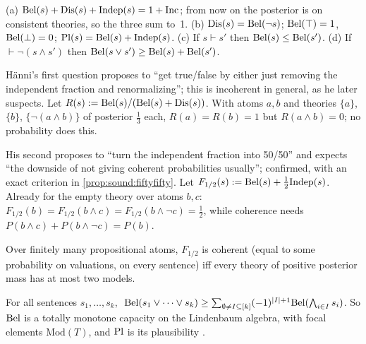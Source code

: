 \begin{proposition}\label{prop:sound:laws}
(a) $\mathrm{Bel}(s)+\mathrm{Dis}(s)+\mathrm{Indep}(s)=1+\mathrm{Inc}$; from now on the posterior is on consistent theories, so the three sum to~1. (b) $\mathrm{Dis}(s)=\mathrm{Bel}(\neg s)$; $\mathrm{Bel}(\top)=1$, $\mathrm{Bel}(\bot)=0$; $\mathrm{Pl}(s)=\mathrm{Bel}(s)+\mathrm{Indep}(s)$. (c) If $s\vdash s'$ then $\mathrm{Bel}(s)\le\mathrm{Bel}(s')$. (d) If $\vdash\neg(s\wedge s')$ then $\mathrm{Bel}(s\vee s')\ge\mathrm{Bel}(s)+\mathrm{Bel}(s')$.
\end{proposition}

\begin{example}\label{ex:sound:renorm}
H\"anni's first question proposes to ``get true/false by either just removing the independent fraction and renormalizing''; this is incoherent in general, as he later suspects. Let $R(s):=\mathrm{Bel}(s)/(\mathrm{Bel}(s)+\mathrm{Dis}(s))$. With atoms $a,b$ and theories $\{a\}$, $\{b\}$, $\{\neg(a\wedge b)\}$ of posterior $\tfrac13$ each, $R(a)=R(b)=1$ but $R(a\wedge b)=0$; no probability does this.
\end{example}

\begin{example}\label{ex:sound:fifty}
His second proposes to ``turn the independent fraction into 50/50'' and expects ``the downside of not giving coherent probabilities usually''; confirmed, with an exact criterion in \cref{prop:sound:fiftyfifty}. Let $F_{1/2}(s):=\mathrm{Bel}(s)+\tfrac12\mathrm{Indep}(s)$. Already for the empty theory over atoms $b,c$: $F_{1/2}(b)=F_{1/2}(b\wedge c)=F_{1/2}(b\wedge\neg c)=\tfrac12$, while coherence needs $P(b\wedge c)+P(b\wedge\neg c)=P(b)$.
\end{example}

\begin{proposition}\label{prop:sound:fiftyfifty}
Over finitely many propositional atoms, $F_{1/2}$ is coherent (equal to some probability on valuations, on every sentence) iff every theory of positive posterior mass has at most two models.
\end{proposition}

\begin{proposition}\label{prop:sound:belief}
For all sentences $s_1,\dots,s_k$, $\ \mathrm{Bel}(s_1\vee\dots\vee s_k)\ge\sum_{\emptyset\ne I\subseteq[k]}(-1)^{|I|+1}\mathrm{Bel}(\bigwedge_{i\in I}s_i)$. So $\mathrm{Bel}$ is a totally monotone capacity on the Lindenbaum algebra, with focal elements $\mathrm{Mod}(T)$, and $\mathrm{Pl}$ is its plausibility \citep{shafer1976mathematical}.
\end{proposition}

